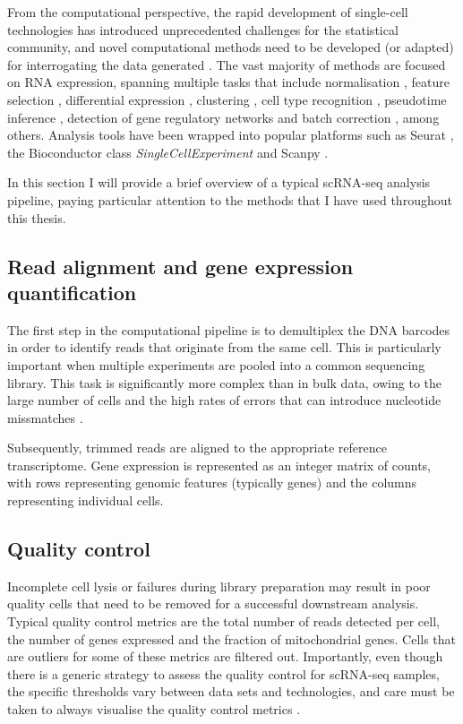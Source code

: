 From the computational perspective, the rapid development of single-cell technologies has introduced unprecedented challenges for the statistical community, and novel computational methods need to be developed (or adapted) for interrogating the data generated \cite{Stegle2015}. The vast majority of methods are focused on RNA expression, spanning multiple tasks that include normalisation \cite{Lun2016a}, feature selection \cite{Townes2019}, differential expression \cite{Kharchenko2014}, clustering \cite{Kiselev2017}, cell type recognition \cite{Abdelaal2019}, pseudotime inference \cite{Haghverdi2016}, detection of gene regulatory networks \cite{Aibar2017} and batch correction \cite{Haghverdi2018}, among others. Analysis tools have been wrapped into popular platforms such as Seurat \cite{Butler2018}, the Bioconductor class \textit{SingleCellExperiment} \cite{Amezquita2020} and Scanpy \cite{Wolf2018}.

In this section I will provide a brief overview of a typical scRNA-seq analysis pipeline, paying particular attention to the methods that I have used throughout this thesis.

\subsection{Read alignment and gene expression quantification}

The first step in the computational pipeline is to demultiplex the DNA barcodes in order to identify reads that originate from the same cell. This is particularly important when multiple experiments are pooled into a common sequencing library. This task is significantly more complex than in bulk data, owing to the large number of cells and the high rates of errors that can introduce nucleotide missmatches \cite{Tambe2019}.

Subsequently, trimmed reads are aligned to the appropriate reference transcriptome. Gene expression is represented as an integer matrix of counts, with rows representing genomic features (typically genes) and the columns representing individual cells. 

\subsection{Quality control}

Incomplete cell lysis or failures during library preparation may result in poor quality cells that need to be removed for a successful downstream analysis. Typical quality control metrics are the total number of reads detected per cell, the number of genes expressed and the fraction of mitochondrial genes. Cells that are outliers for some of these metrics are filtered out. Importantly, even though there is a generic strategy to assess the quality control for scRNA-seq samples, the specific thresholds vary between data sets and technologies, and care must be taken to always visualise the quality control metrics \cite{Luecken2019}.

